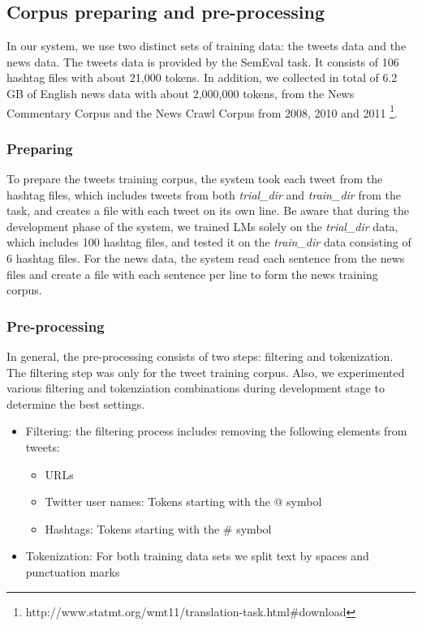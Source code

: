 \documentclass[11pt,a4paper]{article}
\begin{document}
\subsection{Corpus preparing and pre-processing}
In our system, we use two distinct sets of training data: the tweets data and the news data. The tweets data is provided by the SemEval task. It consists of 106 hashtag files with about 21,000 tokens. In addition, we collected in total of 6.2 GB of English news data with about 2,000,000 tokens, from the News Commentary Corpus and the News Crawl Corpus from 2008, 2010 and 2011 \footnote{http://www.statmt.org/wmt11/translation-task.html\#download}.   
\subsubsection{Preparing}
To prepare the tweets training corpus, the system took each tweet from the hashtag files, which includes tweets from both \textit{trial\_dir} and \textit{train\_dir} from the task, and creates a file with each tweet on its own line. Be aware that during the development phase of the system, we trained LMs solely on the \textit{trial\_dir} data, which includes 100 hashtag files, and tested it on the \textit{train\_dir} data consisting of 6 hashtag files. 
For the news data, the system read each sentence from the news files and create a file with each sentence per line to form the news training corpus. 
\subsubsection{Pre-processing}
In general, the pre-processing consists of two steps: filtering and tokenization. The filtering step was only for the tweet training corpus. Also, we experimented various filtering and tokenziation combinations during development stage to determine the best settings. 
\begin{itemize}
\item Filtering: the filtering process includes removing the following elements from tweets:
\begin{itemize}
\item URLs
\item Twitter user names: Tokens starting with the @ symbol 
\item Hashtags: Tokens starting with the \# symbol 
\end{itemize}
\item Tokenization: For both training data sets we split text by spaces and punctuation marks
\end{itemize}
\end{document}
